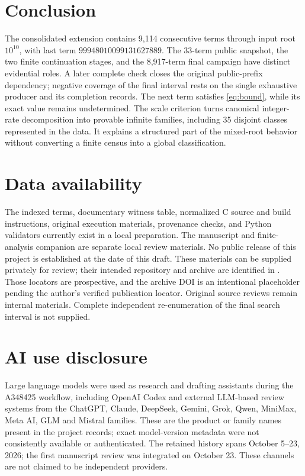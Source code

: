 \documentclass[11pt]{article}
\theoremstyle{definition}
\theoremstyle{remark}
\begin{document}
\section{Conclusion}
The consolidated extension contains 9,114 consecutive terms through
input root $10^{10}$, with last term $99948010099131627889$.
The 33-term public snapshot, the two finite continuation stages,
and the 8,917-term final campaign have distinct evidential roles.
A later complete check closes the original public-prefix dependency;
negative coverage of the final interval rests on the single exhaustive
producer and its completion records.
The next term satisfies \eqref{eq:bound}, while its exact value remains
undetermined. The scale criterion turns canonical integer-rate
decomposition into provable infinite families, including 35 disjoint
classes represented in the data. It explains a structured part of the
mixed-root behavior without converting a finite census into a global
classification.

\section*{Data availability}
The indexed terms, documentary witness table, normalized C source and
build instructions, original execution materials, provenance checks,
and Python validators currently exist in a local preparation. The
manuscript and finite-analysis companion are separate local review
materials. No public release of this project is established at the
date of this draft. These materials can be supplied privately for
review; their intended repository and archive are identified in
\cite{project}. Those locators are prospective, and the archive DOI
is an intentional placeholder pending the author's verified publication
locator. Original source reviews remain internal materials. Complete
independent re-enumeration of the final search interval is not supplied.

\section*{AI use disclosure}
Large language models were used as research and drafting assistants during
the A348425 workflow, including OpenAI Codex and external LLM-based
review systems from the ChatGPT, Claude, DeepSeek, Gemini, Grok, Qwen,
MiniMax, Meta AI, GLM and Mistral families. These are the product or family
names present in the project records; exact model-version metadata were
not consistently available or authenticated. The retained history spans
October 5--23, 2026; the first manuscript review was integrated on
October 23. These channels are not claimed to be independent providers.
\end{document}
